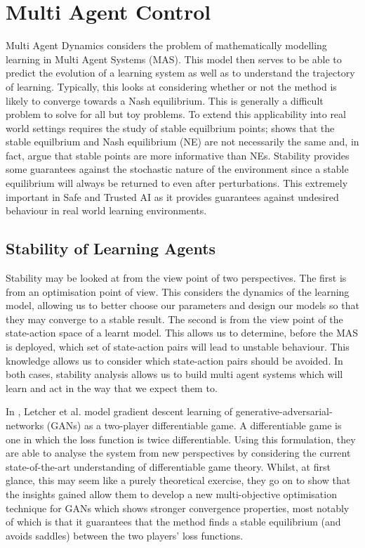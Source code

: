 \documentclass[preprint,8pt]{report}
\begin{document}
\chapter{Multi Agent Control}

Multi Agent Dynamics considers the problem of mathematically modelling learning in Multi Agent Systems (MAS). This model then serves to be able to predict the evolution of a learning system as well as to understand the trajectory of learning. Typically, this looks at considering whether or not the method is likely to converge towards a Nash equilibrium. This is generally a difficult problem to solve \cite{ShohamMultiagentFoundations} for all but toy problems. To extend this applicability into real world settings requires the study of stable equilbrium points; \cite{Letcher2019DifferentiableMechanics} shows that the stable equilbrium and Nash equilibrium (NE) are not necessarily the same and, in fact, argue that stable points are more informative than NEs. Stability provides some guarantees against the stochastic nature of the environment since a stable equilibrium will always be returned to even after perturbations. This extremely important in Safe and Trusted AI as it provides guarantees against undesired behaviour in real world learning environments. 

\section{Stability of Learning Agents}

Stability may be looked at from the view point of two perspectives. The first is from an optimisation point of view. This considers the dynamics of the learning model, allowing us to better choose our parameters and design our models so that they may converge to a stable result. The second is from the view point of the state-action space of a learnt model. This allows us to determine, before the MAS is deployed, which set of state-action pairs will lead to unstable behaviour. This knowledge allows us to consider which state-action pairs should be avoided. In both cases, stability analysis allows us to build multi agent systems which will learn and act in the way that we expect them to.

In \cite{Letcher2019DifferentiableMechanics}, Letcher et al. model gradient descent learning of generative-adversarial-networks (GANs) as a two-player differentiable game. A differentiable game is one in which the loss function is twice differentiable. Using this formulation, they are able to analyse the system from new perspectives by considering the current state-of-the-art understanding of differentiable game theory. Whilst, at first glance, this may seem like a purely theoretical exercise, they go on to show that the insights gained allow them to develop a new multi-objective optimisation technique for GANs which shows stronger convergence properties, most notably of which is that it guarantees that the method finds a stable equilibrium (and avoids saddles) between the two players' loss functions.
\end{document}

